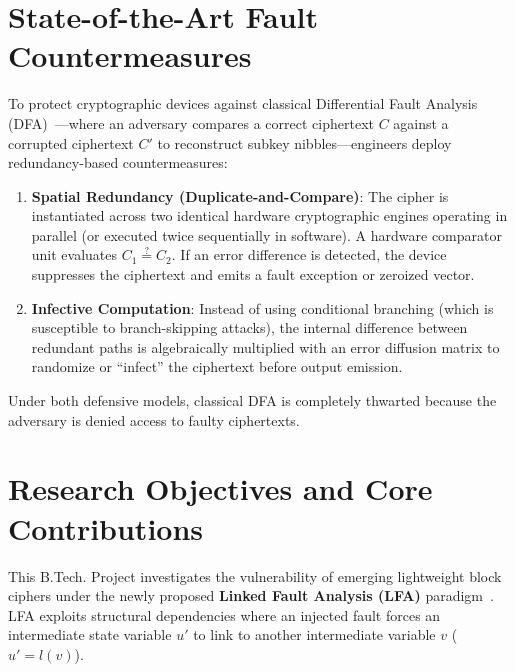 \documentclass[12pt,a4paper,oneside]{report}
\begin{document}
\section{State-of-the-Art Fault Countermeasures}
\label{sec:countermeasures_state_of_art}
To protect cryptographic devices against classical Differential Fault Analysis (DFA)~\cite{biham1997differential}---where an adversary compares a correct ciphertext $C$ against a corrupted ciphertext $C'$ to reconstruct subkey nibbles---engineers deploy redundancy-based countermeasures:
\begin{enumerate}
    \item \textbf{Spatial Redundancy (Duplicate-and-Compare)}: The cipher is instantiated across two identical hardware cryptographic engines operating in parallel (or executed twice sequentially in software). A hardware comparator unit evaluates $C_1 \stackrel{?}{=} C_2$. If an error difference is detected, the device suppresses the ciphertext and emits a fault exception or zeroized vector.
    \item \textbf{Infective Computation}: Instead of using conditional branching (which is susceptible to branch-skipping attacks), the internal difference between redundant paths is algebraically multiplied with an error diffusion matrix to randomize or ``infect'' the ciphertext before output emission.
\end{enumerate}
Under both defensive models, classical DFA is completely thwarted because the adversary is denied access to faulty ciphertexts.

\section{Research Objectives and Core Contributions}
\label{sec:contributions}
This B.Tech. Project investigates the vulnerability of emerging lightweight block ciphers under the newly proposed \textbf{Linked Fault Analysis (LFA)} paradigm~\cite{beigizad2024linked}. LFA exploits structural dependencies where an injected fault forces an intermediate state variable $u'$ to link to another intermediate variable $v$ ($u' = l(v)$).
\end{document}

